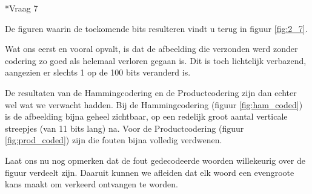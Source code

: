 \documentclass[]{article}
\begin{document}
\begin{section}
    \begin{subsection}*{Vraag 7} %

        De figuren waarin de toekomende bits resulteren vindt u terug in figuur
        \ref{fig:2_7}.
        
        Wat ons eerst en vooral opvalt, is dat de afbeelding die verzonden werd
        zonder codering zo goed als helemaal verloren gegaan is. Dit is toch
        lichtelijk verbazend, aangezien er slechts 1 op de 100 bits veranderd
        is.

        De resultaten van de Hammingcodering en de Productcodering zijn dan
        echter wel wat we verwacht hadden. Bij de Hammingcodering (figuur
        \ref{fig:ham_coded}) is de afbeelding bijna geheel zichtbaar, op een
        redelijk groot aantal verticale streepjes (van 11 bits lang) na. Voor
        de Productcodering (figuur \ref{fig:prod_coded}) zijn die fouten bijna
        volledig verdwenen.

        Laat ons nu nog opmerken dat de fout gedecodeerde woorden willekeurig
        over de figuur verdeelt zijn. Daaruit kunnen we afleiden dat elk
        woord een evengroote kans maakt om verkeerd ontvangen te worden.

        \begin{figure}
            \centering


\end{figure}
\end{subsection}
\end{section}
\end{document}
